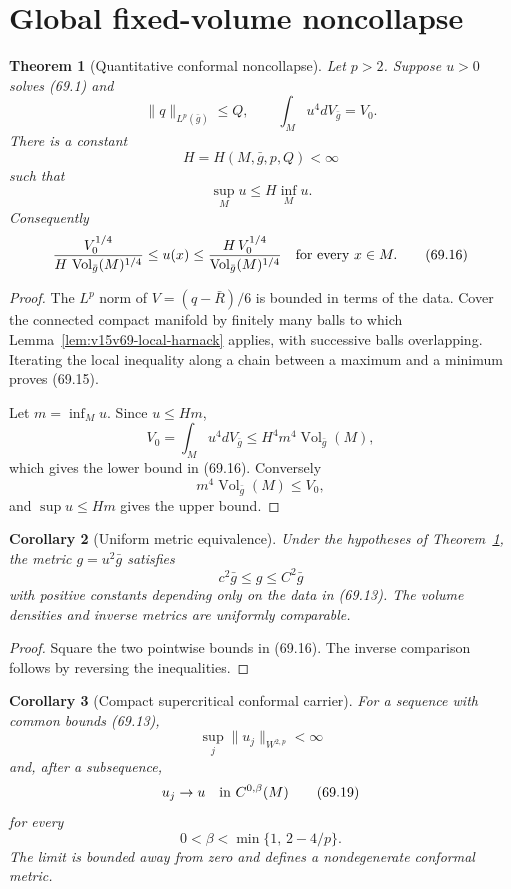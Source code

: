 \documentclass[11pt]{article}
\newtheorem{theorem}{Theorem}[section]
\newtheorem{corollary}[theorem]{Corollary}
\theoremstyle{remark}
\begin{document}
\section{Global fixed-volume noncollapse}

\begin{theorem}[Quantitative conformal noncollapse]
\label{thm:v15v69-global-harnack}
Let \(p>2\).  Suppose \(u>0\) solves (69.1) and
\[
 \|q\|_{L^p(\bar g)}\leq Q,\qquad
 \int_Mu^4dV_{\bar g}=V_0.                            \tag{69.13}
\]
There is a constant
\[
 H=H(M,\bar g,p,Q)<\infty                             \tag{69.14}
\]
such that
\[
 \sup_Mu\leq H\inf_Mu.                                \tag{69.15}
\]
Consequently
\[
 \frac{V_0^{1/4}}
 {H\,\operatorname{Vol}_{\bar g}(M)^{1/4}}
 \leq u(x)\leq
 \frac{H\,V_0^{1/4}}
 {\operatorname{Vol}_{\bar g}(M)^{1/4}}
 \quad\hbox{for every }x\in M.                        \tag{69.16}
\]
\end{theorem}

\begin{proof}
The \(L^p\) norm of \(V=(q-\bar R)/6\) is bounded in terms of the
data.  Cover the connected compact manifold by finitely many balls
to which Lemma~\ref{lem:v15v69-local-harnack} applies, with
successive balls overlapping.  Iterating the local inequality
along a chain between a maximum and a minimum proves (69.15).

Let \(m=\inf_Mu\).  Since \(u\leq Hm\),
\[
 V_0=\int_Mu^4dV_{\bar g}
 \leq H^4m^4\operatorname{Vol}_{\bar g}(M),
\]
which gives the lower bound in (69.16).  Conversely
\[
 m^4\operatorname{Vol}_{\bar g}(M)\leq V_0,
\]
and \(\sup u\leq Hm\) gives the upper bound.
\end{proof}

\begin{corollary}[Uniform metric equivalence]
\label{cor:v15v69-metric}
Under the hypotheses of
Theorem~\ref{thm:v15v69-global-harnack}, the metric
\(g=u^2\bar g\) satisfies
\[
 c^2\bar g\leq g\leq C^2\bar g                       \tag{69.17}
\]
with positive constants depending only on the data in (69.13).
The volume densities and inverse metrics are uniformly comparable.
\end{corollary}

\begin{proof}
Square the two pointwise bounds in (69.16).  The inverse comparison
follows by reversing the inequalities.
\end{proof}

\begin{corollary}[Compact supercritical conformal carrier]
\label{cor:v15v69-carrier}
For a sequence with common bounds (69.13),
\[
 \sup_j\|u_j\|_{W^{2,p}}<\infty                       \tag{69.18}
\]
and, after a subsequence,
\[
 u_j\to u\quad\hbox{in }C^{0,\beta}(M)                \tag{69.19}
\]
for every
\[
 0<\beta<\min\{1,\,2-4/p\}.
\]
The limit is bounded away from zero and defines a nondegenerate
conformal metric.
\end{corollary}
\end{document}
